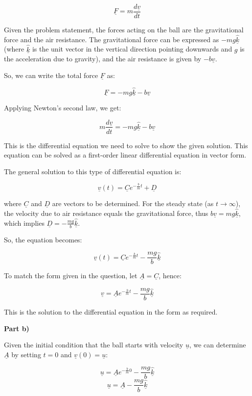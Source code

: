 \documentclass[a4paper,11pt]{article}
\begin{document}
\[ \underline{F} = m\frac{d\underline{v}}{dt} \]

Given the problem statement, the forces acting on the ball are the gravitational force and the air resistance. The gravitational force can be expressed as \( -mg\hat{\underline{k}} \) (where \( \hat{\underline{k}} \) is the unit vector in the vertical direction pointing downwards and \( g \) is the acceleration due to gravity), and the air resistance is given by \( -b\underline{v} \).

So, we can write the total force \( \underline{F} \) as:

\[ \underline{F} = -mg\hat{\underline{k}} - b\underline{v} \]

Applying Newton's second law, we get:

\[ m\frac{d\underline{v}}{dt} = -mg\hat{\underline{k}} - b\underline{v} \]

This is the differential equation we need to solve to show the given solution. This equation can be solved as a first-order linear differential equation in vector form.

The general solution to this type of differential equation is:

\[ \underline{v}(t) = \underline{C}e^{-\frac{b}{m}t} + \underline{D} \]

where \( \underline{C} \) and \( \underline{D} \) are vectors to be determined. For the steady state (as \( t \rightarrow \infty \)), the velocity due to air resistance equals the gravitational force, thus \( b\underline{v} = mg\hat{\underline{k}} \), which implies \( \underline{D} = -\frac{mg}{b}\hat{\underline{k}} \).

So, the equation becomes:

\[ \underline{v}(t) = \underline{C}e^{-\frac{b}{m}t} - \frac{mg}{b}\hat{\underline{k}} \]

To match the form given in the question, let \( \underline{A} = \underline{C} \), hence:

\[ \underline{v} = \underline{A}e^{-\frac{b}{m}t} - \frac{mg}{b}\hat{\underline{k}} \]

This is the solution to the differential equation in the form as required.

\textbf{Part b)}

Given the initial condition that the ball starts with velocity \( \underline{u} \), we can determine \( \underline{A} \) by setting \( t = 0 \) and \( \underline{v}(0) = \underline{u} \):

\[ \underline{u} = \underline{A}e^{-\frac{b}{m}0} - \frac{mg}{b}\hat{\underline{k}} \]
\[ \underline{u} = \underline{A} - \frac{mg}{b}\hat{\underline{k}} \]
\end{document}
